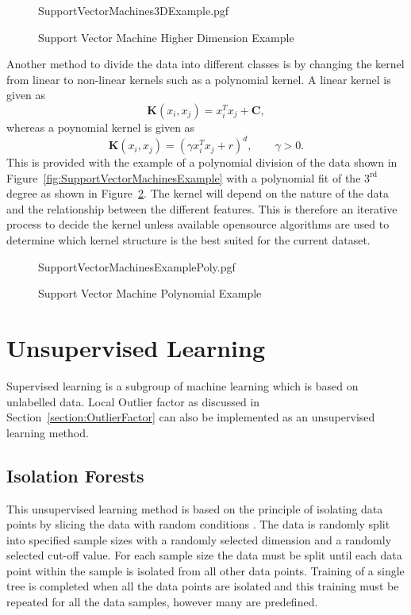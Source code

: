\begin{figure}[!hbt]
	\centering
	{SupportVectorMachines3DExample.pgf}
	\caption{Support Vector Machine Higher Dimension Example}
	\label{fig:SupportVectorMachines3DExample}
\end{figure}

Another method to divide the data into different classes is by changing the kernel from linear to non-linear kernels such as a polynomial kernel. A linear kernel is given as 
\begin{equation}
\mathbf{K}\left(x_i,x_j \right) = x_i^Tx_j+ \mathbf{C},
\end{equation}
whereas a poynomial kernel is given as
\begin{equation}
\mathbf{K}\left(x_i,x_j \right) = \left(\gamma x_i^Tx_j + r \right)^d, \qquad \gamma > 0.
\end{equation}
This is provided with the example of a polynomial division of the data shown in Figure~\ref{fig:SupportVectorMachinesExample} with a polynomial fit of the $3^{\text{rd}}$ degree as shown in Figure~\ref{fig:SupportVectorMachinesExamplePoly}. The kernel will depend on the nature of the data and the relationship between the different features. This is therefore an iterative process to decide the kernel unless available opensource algorithms are used to determine which kernel structure is the best suited for the current dataset.

\begin{figure}[!hbt]
	\centering
	{SupportVectorMachinesExamplePoly.pgf}
	\caption{Support Vector Machine Polynomial Example}
	\label{fig:SupportVectorMachinesExamplePoly}
\end{figure}

\section{Unsupervised Learning}
Supervised learning is a subgroup of machine learning which is based on unlabelled data. Local Outlier factor as discussed in Section~\ref{section:OutlierFactor} can also be implemented as an unsupervised learning method.

\subsection{Isolation Forests}
This unsupervised learning method is based on the principle of isolating data points by slicing the data with random conditions \cite{TonyLiu2008}. The data is randomly split into specified sample sizes with a randomly selected dimension and a randomly selected cut-off value. For each sample size the data must be split until each data point within the sample is isolated from all other data points. Training of a single tree is completed when all the data points are isolated and this training must be repeated for all the data samples, however many are predefined. 


